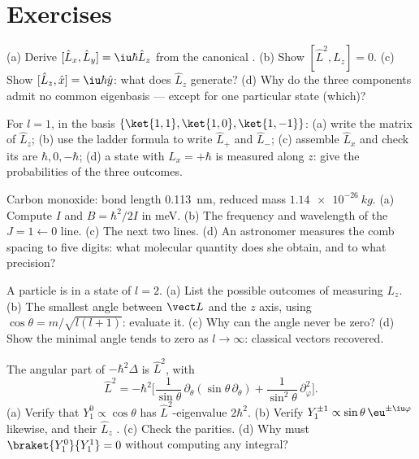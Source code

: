 \section{Exercises}

\begin{exercise}[$\star$]\label{exo:b3:quantum-angular-momentum:1}
(a) Derive $[\hat L_x, \hat L_y] = \iu\hbar\hat L_z$ from the
canonical . (b) Show $[\hat L^2, \hat L_z] = 0$. (c) Show
$[\hat L_z, \hat x] = \iu\hbar\hat y$: what does $\hat L_z$
generate? (d) Why do the three components admit no common eigenbasis
--- except for one particular state (which)?
\end{exercise}

\begin{exercise}[$\star$]\label{exo:b3:quantum-angular-momentum:2}
For $l = 1$, in the basis $\{\ket{1,1}, \ket{1,0}, \ket{1,-1}\}$:
(a) write the matrix of $\hat L_z$; (b) use the ladder formula to
write $\hat L_+$ and $\hat L_-$; (c) assemble $\hat L_x$ and check
its  are $\hbar, 0, -\hbar$; (d) a state with $L_x =
+\hbar$ is measured along $z$: give the probabilities of the three
outcomes.
\end{exercise}

\begin{exercise}[$\star$]\label{exo:b3:quantum-angular-momentum:3}
Carbon monoxide: bond length \qty{0.113}{nm}, reduced mass
$\qty{1.14e-26}{kg}$. (a) Compute $I$ and $B = \hbar^2/2I$ in meV.
(b) The frequency and wavelength of the $J = 1 \leftarrow 0$ line.
(c) The next two lines. (d) An astronomer measures the comb spacing
to five digits: what molecular quantity does she obtain, and to what
precision?
\end{exercise}

\begin{exercise}[$\star$]\label{exo:b3:quantum-angular-momentum:4}
A particle is in a state of $l = 2$. (a) List the possible outcomes
of measuring $L_z$. (b) The smallest angle between $\vect L$ and the
$z$ axis, using $\cos\theta = m/\sqrt{l(l+1)}$: evaluate it. (c) Why
can the angle never be zero? (d) Show the minimal angle tends to
zero as $l \to \infty$: classical vectors recovered.
\end{exercise}

\begin{exercise}[$\star\star$]\label{exo:b3:quantum-angular-momentum:5}
The angular part of $-\hbar^2\Delta$ is $\hat L^2$, with
\[
\hat L^2 = -\hbar^2\Big[\frac{1}{\sin\theta}\,\partial_\theta
(\sin\theta\,\partial_\theta) +
\frac{1}{\sin^2\theta}\,\partial_\varphi^2\Big] .
\]
(a) Verify that $Y_1^0 \propto \cos\theta$ has $\hat L^2$-eigenvalue
$2\hbar^2$. (b) Verify $Y_1^{\pm1} \propto \sin\theta\,
\eu^{\pm\iu\varphi}$ likewise, and their $\hat L_z$ . (c)
Check the parities. (d) Why must $\braket{Y_1^0}{Y_1^1} = 0$ without
computing any integral?
\end{exercise}

